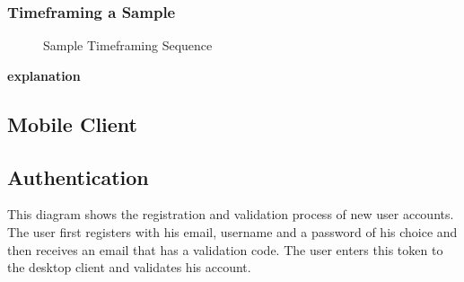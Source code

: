 \subsubsection{Timeframing a Sample}
\begin{figure}[!htb]
    \centering
    \caption{Sample Timeframing Sequence}
    \label{fig:seq-timeframing-a-sample}
\end{figure}

\textbf{explanation}
\newpage

\subsection{Mobile Client}

\subsection{Authentication}

This diagram shows the registration and validation process of new user accounts. The user first registers with his email, username and a password of his choice and then receives an email that has a validation code. The user enters this token to the desktop client and validates his account.
